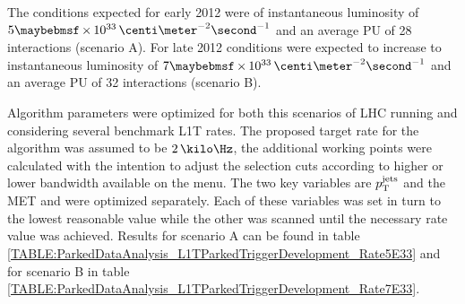 The conditions expected for early 2012 were of instantaneous luminosity of $5 \times 10^{33}\,\centi\meter^{-2}\second^{-1}$ and an average \gls{PU} of 28 interactions (scenario A). For late 2012 conditions were expected to increase to instantaneous luminosity of $7 \times 10^{33}\,\centi\meter^{-2}\second^{-1}$ and an average \gls{PU} of 32 interactions (scenario B).

Algorithm parameters were optimized for both this scenarios of \gls{LHC} running and considering several benchmark \gls{L1T} rates. The proposed target rate for the algorithm was assumed to be $2\,\kilo\Hz$, the additional working points were calculated with the intention to adjust the selection cuts according to higher or lower bandwidth available on the menu. The two key variables are $p_{\mathrm{T}}^{\text{jets}}$ and the \gls{MET} and were optimized separately. Each of these variables was set in turn to the lowest reasonable value while the other was scanned until the necessary rate value was achieved.  Results for scenario A can be found in table \ref{TABLE:ParkedDataAnalysis_L1TParkedTriggerDevelopment_Rate5E33} and for scenario B in table \ref{TABLE:ParkedDataAnalysis_L1TParkedTriggerDevelopment_Rate7E33}.


